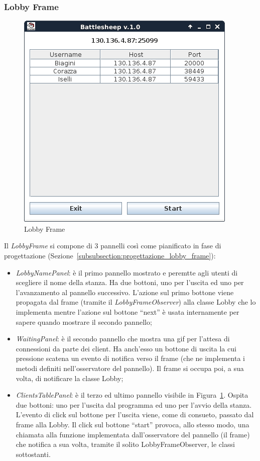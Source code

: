 \subsubsection{Lobby Frame}
\begin{figure}[!h]
	\centering
	\includegraphics[scale=0.5]{core/imgs/gui/lobby_frame}
	\caption{Lobby Frame}
	\label{figure:lobby_frame}
\end{figure}
Il \textit{LobbyFrame} si compone di 3 pannelli così come pianificato in fase di
progettazione (Sezione~\ref{subsubsection:progettazione_lobby_frame}):
\begin{itemize}
	\item \textit{LobbyNamePanel}: è il primo pannello mostrato e peremtte agli
	utenti di scegliere il nome della stanza. Ha due bottoni, uno per l'uscita
	ed uno per l'avanzamento al pannello successivo. L'azione sul primo bottone
	viene propagata dal frame (tramite il \textit{LobbyFrameObserver}) alla
	classe Lobby che lo implementa mentre l'azione sul bottone ``next'' è usata
	internamente per sapere quando mostrare il secondo pannello;
	\item \textit{WaitingPanel}: è il secondo pannello che mostra una gif per
	l'attesa di connessioni da parte dei client. Ha anch'esso un bottone di
	uscita la cui pressione scatena un evento di notifica verso il frame (che
	ne implementa i metodi definiti nell'osservatore del pannello). Il frame
	si occupa poi, a sua volta, di notificare la classe Lobby;
	\item \textit{ClientsTablePanel}: è il terzo ed ultimo pannello visibile in
	Figura~\ref{figure:lobby_frame}. Ospita due bottoni: uno per l'uscita dal
	programma ed uno per l'avvio della stanza. L'evento di click sul bottone
	per l'uscita viene, come di consueto, passato dal frame alla Lobby. Il click
	sul bottone ``start'' provoca, allo stesso modo, una chiamata alla funzione
	implementata dall'osservatore del pannello (il frame) che notifica a sua
	volta, tramite il solito LobbyFrameObserver, le classi sottostanti.
\end{itemize}
